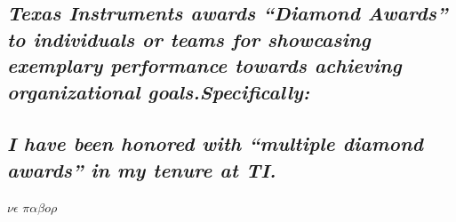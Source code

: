 \documentclass[11pt,letterpaper]{moderncv}
\begin{document}
	\subsection{\emph{Texas Instruments awards ``Diamond Awards'' to individuals or teams for showcasing exemplary performance towards achieving organizational goals.\newline \newline Specifically:}}
  

	\subsection{\emph{I have been honored with ``multiple diamond awards'' in my tenure at TI.}}
	
\cvline {}{}

\begin{center}
\color{gray}\Large{$\nu\epsilon$ $\pi\alpha\beta o \rho$}
\end{center}
	
\end{document}
